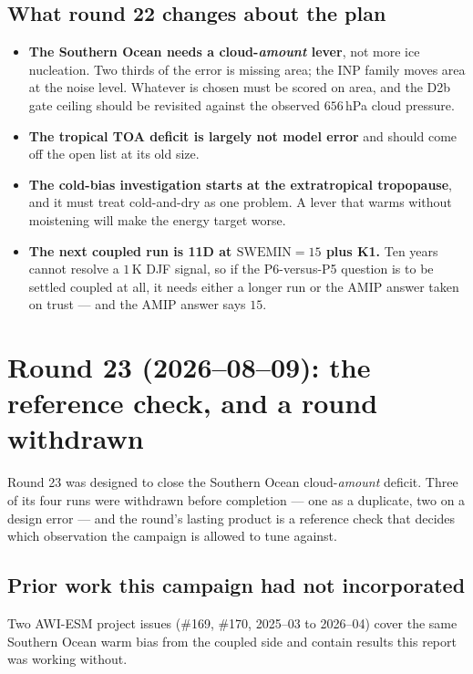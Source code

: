 \documentclass[10pt]{article}
\begin{document}
\subsection{What round 22 changes about the plan}\label{sub:r22plan}
\begin{itemize}\itemsep2pt
\item \textbf{The Southern Ocean needs a cloud-\emph{amount} lever}, not more ice
nucleation. Two thirds of the error is missing area; the INP family moves area at the
noise level. Whatever is chosen must be scored on area, and the D2b gate ceiling should be
revisited against the observed $656$\,hPa cloud pressure.
\item \textbf{The tropical TOA deficit is largely not model error} and should come off the
open list at its old size.
\item \textbf{The cold-bias investigation starts at the extratropical tropopause}, and it
must treat cold-and-dry as one problem. A lever that warms without moistening will make
the energy target worse.
\item \textbf{The next coupled run is 11D at $\mathrm{SWEMIN}=15$ plus K1.} Ten years
cannot resolve a $1$\,K DJF signal, so if the P6-versus-P5 question is to be settled
coupled at all, it needs either a longer run or the AMIP answer taken on trust --- and
the AMIP answer says $15$.
\end{itemize}

\section{Round 23 (2026--08--09): the reference check, and a round withdrawn}\label{sec:r23}
Round 23 was designed to close the Southern Ocean cloud-\emph{amount} deficit. Three of its
four runs were withdrawn before completion --- one as a duplicate, two on a design error ---
and the round's lasting product is a reference check that decides which observation the
campaign is allowed to tune against.

\subsection{Prior work this campaign had not incorporated}\label{sub:r23prior}
Two AWI-ESM project issues (\#169, \#170, 2025--03 to 2026--04) cover the same Southern Ocean
warm bias from the coupled side and contain results this report was working without.
\end{document}
